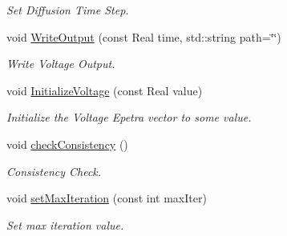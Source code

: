 \begin{DoxyCompactItemize}
\begin{DoxyCompactList}\small\item\em Set Diffusion Time Step. \item\end{DoxyCompactList}\item 
void \hyperlink{classvoom_1_1_e_p_solver_a22722e9e010bbf7f3eff3bddfac65d26}{WriteOutput} (const Real time, std::string path=\char`\"{}\char`\"{})
\begin{DoxyCompactList}\small\item\em Write Voltage Output. \item\end{DoxyCompactList}\item 
\hypertarget{classvoom_1_1_e_p_solver_a799c7be11501b5219dc9d70ecab6c6f8}{
void \hyperlink{classvoom_1_1_e_p_solver_a799c7be11501b5219dc9d70ecab6c6f8}{InitializeVoltage} (const Real value)}
\label{classvoom_1_1_e_p_solver_a799c7be11501b5219dc9d70ecab6c6f8}

\begin{DoxyCompactList}\small\item\em Initialize the Voltage Epetra vector to some value. \item\end{DoxyCompactList}\item 
\hypertarget{classvoom_1_1_e_p_solver_aad9e64f79ea2c37c9564c753154a1348}{
void \hyperlink{classvoom_1_1_e_p_solver_aad9e64f79ea2c37c9564c753154a1348}{checkConsistency} ()}
\label{classvoom_1_1_e_p_solver_aad9e64f79ea2c37c9564c753154a1348}

\begin{DoxyCompactList}\small\item\em Consistency Check. \item\end{DoxyCompactList}\item 
\hypertarget{classvoom_1_1_e_p_solver_a5d21fb473643d546d40c6f3ac6ecaecd}{
void \hyperlink{classvoom_1_1_e_p_solver_a5d21fb473643d546d40c6f3ac6ecaecd}{setMaxIteration} (const int maxIter)}
\label{classvoom_1_1_e_p_solver_a5d21fb473643d546d40c6f3ac6ecaecd}

\begin{DoxyCompactList}\small\item\em Set max iteration value. \item\end{DoxyCompactList}\end{DoxyCompactItemize}

